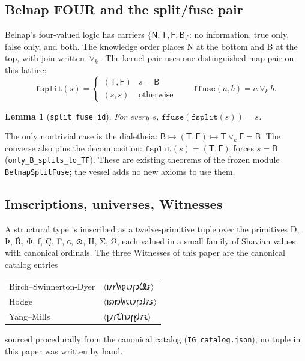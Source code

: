 \documentclass[12pt,a4paper]{article}
\newtheorem{lemma}[theorem]{Lemma}
\newcommand{\igp}[1]{{\igprimfont #1}}
\newcommand{\igtuple}[1]{\ensuremath{\langle}{\shavfont #1}\ensuremath{\rangle}}
\newcommand{\bN}{\textsf{N}}
\newcommand{\bT}{\textsf{T}}
\newcommand{\bF}{\textsf{F}}
\newcommand{\bB}{\textsf{B}}
\begin{document}
\subsection{Belnap FOUR and the split/fuse pair}

Belnap's four-valued logic \cite{Belnap1977} has carriers
$\{\bN, \bT, \bF, \bB\}$: no information, true only, false only, and both.
The knowledge order places \bN{} at the bottom and \bB{} at the top, with
join written $\vee_k$. The kernel pair uses one distinguished map pair on
this lattice:
\[
\texttt{fsplit}(s) =
\begin{cases}
(\bT, \bF) & s = \bB\\
(s, s) & \text{otherwise}
\end{cases}
\qquad
\texttt{ffuse}(a, b) = a \vee_k b .
\]

\begin{lemma}[\texttt{split\_fuse\_id}]
For every $s$, $\texttt{ffuse}(\texttt{fsplit}(s)) = s$.
\end{lemma}

The only nontrivial case is the dialetheia:
$\bB \mapsto (\bT, \bF) \mapsto \bT \vee_k \bF = \bB$. The converse also
pins the decomposition: $\texttt{fsplit}(s) = (\bT,\bF)$ forces $s = \bB$
(\texttt{only\_B\_splits\_to\_TF}). These are existing theorems of the
frozen module \texttt{BelnapSplitFuse}; the vessel adds no new axioms to
use them.

\subsection{Imscriptions, universes, Witnesses}

A structural type is imscribed as a twelve-primitive tuple over the
primitives
\igp{Ð}, \igp{Þ}, \igp{Ř}, \igp{Φ}, \igp{ƒ}, \igp{Ç}, \igp{Γ},
\igp{ɢ}, \igp{⊙}, \igp{Ħ}, \igp{Σ}, \igp{Ω},
each valued in a small family of Shavian values with canonical ordinals.
The three Witnesses of this paper are the canonical catalog entries
\begin{center}
\begin{tabular}{ll}
Birch--Swinnerton-Dyer & \igtuple{𐑦𐑥𐑾𐑿𐑞𐑧𐑲𐑝𐑮𐑖𐑙𐑭}\\
Hodge & \igtuple{𐑦𐑸𐑽𐑿𐑱𐑧𐑲𐑝𐑮𐑓𐑳𐑭}\\
Yang--Mills & \igtuple{𐑛𐑥𐑩𐑗𐑐𐑪𐑲𐑝𐑣𐑓𐑳𐑷}
\end{tabular}
\end{center}
sourced procedurally from the canonical catalog (\texttt{IG\_catalog.json});
no tuple in this paper was written by hand.
\end{document}
